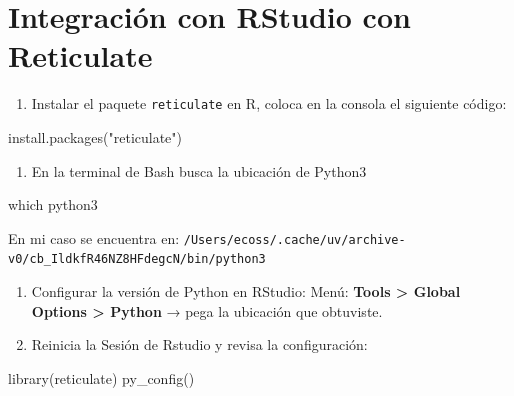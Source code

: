 \documentclass[
  spanish,
  12pt,
  letterpaper,
  DIV=11,
  numbers=noendperiod]{scrreprt}
\newenvironment{Shaded}{\begin{snugshade}}{\end{snugshade}}
\newcommand{\FunctionTok}[1]{\textcolor[rgb]{0.28,0.35,0.67}{#1}}
\newcommand{\NormalTok}[1]{\textcolor[rgb]{0.00,0.23,0.31}{#1}}
\newcommand{\StringTok}[1]{\textcolor[rgb]{0.13,0.47,0.30}{#1}}
\providecommand{\tightlist}{%
  \setlength{\itemsep}{0pt}\setlength{\parskip}{0pt}}
\begin{document}
\section{Integración con RStudio con
Reticulate}\label{integraciuxf3n-con-rstudio-con-reticulate}

\begin{enumerate}
\def\labelenumi{\arabic{enumi}.}
\tightlist
\item
  Instalar el paquete \texttt{reticulate} en R, coloca en la consola el
  siguiente código:
\end{enumerate}

\begin{Shaded}
\begin{Highlighting}[]
\FunctionTok{install.packages}\NormalTok{(}\StringTok{"reticulate"}\NormalTok{)}
\end{Highlighting}
\end{Shaded}

\begin{enumerate}
\def\labelenumi{\arabic{enumi}.}
\setcounter{enumi}{1}
\tightlist
\item
  En la terminal de Bash busca la ubicación de Python3
\end{enumerate}

\begin{Shaded}
\begin{Highlighting}[]
\FunctionTok{which}\NormalTok{ python3}
\end{Highlighting}
\end{Shaded}

En mi caso se encuentra en:
\texttt{/Users/ecoss/.cache/uv/archive-v0/cb\_IldkfR46NZ8HFdegcN/bin/python3}

\begin{enumerate}
\def\labelenumi{\arabic{enumi}.}
\setcounter{enumi}{2}
\tightlist
\item
  Configurar la versión de Python en RStudio: Menú: \textbf{Tools
  \textgreater{} Global Options \textgreater{} Python} → pega la
  ubicación que obtuviste.
\item
  Reinicia la Sesión de Rstudio y revisa la configuración:
\end{enumerate}

\begin{Shaded}
\begin{Highlighting}[]
\FunctionTok{library}\NormalTok{(reticulate)}
\FunctionTok{py\_config}\NormalTok{()}
\end{Highlighting}
\end{Shaded}
\end{document}
